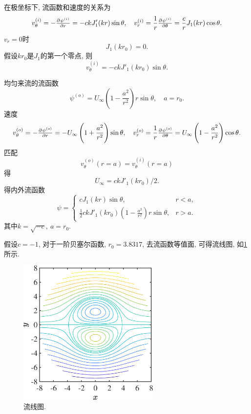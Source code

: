 \documentclass[12pt]{article}
\begin{document}
在极坐标下, 流函数和速度的关系为
\begin{equation}
	v^{(i)}_\theta = -\pd{\psi^{(i)}}{r}= - ck J'_{1}(k r) \sin \theta,\quad v^{(i)}_r = \frac{1}{r} \pd{\psi^{(i)}}{\theta}=  \frac{c}{r}  J_{1}(k r) \cos \theta.
\end{equation}
$v_r=0$时
\begin{equation}
	J_1(kr_0) = 0.
\end{equation}
假设$kr_0$是$J_1$的第一个零点, 则
\begin{equation}
	v^{(i)}_\theta = - ck J'_{1}(k r_0) \sin \theta.
\end{equation}

均匀来流的流函数
\begin{equation}
	\psi^{(o)} = U_{\infty}\left(1-\frac{a^{2}}{r^{2}}\right) r \sin \theta, \quad a = r_0.
\end{equation}
速度
\begin{equation}
	v^{(o)}_\theta = - \pd{\psi^{(o)}}{r}= - U_{\infty}\left(1+\frac{a^{2}}{r^{2}}\right) \sin \theta, \quad v^{(o)}_r = \frac{1}{r} \pd{\psi^{(o)}}{\theta}= U_{\infty}\left(1-\frac{a^{2}}{r^{2}}\right)  \cos \theta.
\end{equation}
匹配
\begin{equation}
	v^{(o)}_\theta (r=a) = v^{(i)}_\theta (r=a)
\end{equation}
得
\begin{equation}
	U_{\infty} = ck J'_{1}(k r_0)/2.
\end{equation}
得内外流函数
\begin{equation}
	\psi = 
	\begin{cases}
		c J_{1}(k r) \sin \theta, & r<a,\\
		\frac{1}{2}ck J'_{1}(k r_0)\left(1-\frac{a^{2}}{r^{2}}\right) r \sin \theta, & r>a.
	\end{cases}
\end{equation}
其中$k=\sqrt{-c},\ a=r_0$.

假设$c=-1$, 对于一阶贝塞尔函数, $r_0 = 3.8317$, 去流函数等值面, 可得流线图, 如\cref{fig:4} 所示. 

\begin{figure}[htp]
	\centering
	\includegraphics[width=7cm]{4.eps}
	\caption{流线图.}
	\label{fig:4}
\end{figure}
\end{document}
